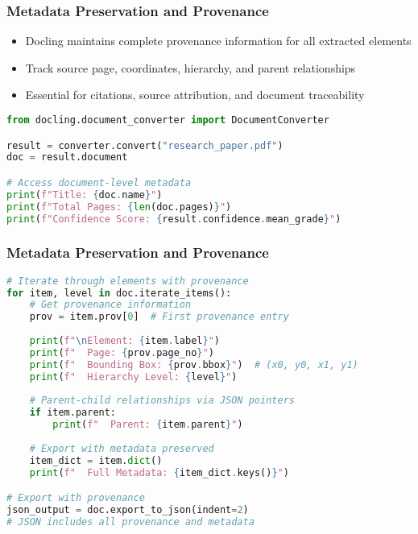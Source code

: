 \begin{frame}[fragile]\frametitle{Metadata Preservation and Provenance}
      \begin{itemize}
          \item Docling maintains complete provenance information for all extracted elements
          \item Track source page, coordinates, hierarchy, and parent relationships
          \item Essential for citations, source attribution, and document traceability
      \end{itemize}
      
\begin{lstlisting}[language=Python, basicstyle=\tiny]
from docling.document_converter import DocumentConverter

result = converter.convert("research_paper.pdf")
doc = result.document

# Access document-level metadata
print(f"Title: {doc.name}")
print(f"Total Pages: {len(doc.pages)}")
print(f"Confidence Score: {result.confidence.mean_grade}")

\end{lstlisting}
\end{frame}


\begin{frame}[fragile]\frametitle{Metadata Preservation and Provenance}

\begin{lstlisting}[language=Python, basicstyle=\tiny]
# Iterate through elements with provenance
for item, level in doc.iterate_items():
    # Get provenance information
    prov = item.prov[0]  # First provenance entry
    
    print(f"\nElement: {item.label}")
    print(f"  Page: {prov.page_no}")
    print(f"  Bounding Box: {prov.bbox}")  # (x0, y0, x1, y1)
    print(f"  Hierarchy Level: {level}")
    
    # Parent-child relationships via JSON pointers
    if item.parent:
        print(f"  Parent: {item.parent}")
    
    # Export with metadata preserved
    item_dict = item.dict()
    print(f"  Full Metadata: {item_dict.keys()}")

# Export with provenance
json_output = doc.export_to_json(indent=2)
# JSON includes all provenance and metadata
\end{lstlisting}
\end{frame}

